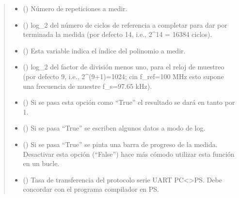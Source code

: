 \documentclass[letterpaper,10pt,english]{sphinxmanual}
\begin{document}
\begin{fulllineitems}
\begin{fulllineitems}
\begin{quote}
\begin{description}
\begin{itemize}
\item {} 
\sphinxAtStartPar
{} () \textendash{} Número de repeticiones a medir.

\item {} 
\sphinxAtStartPar
{} () \textendash{} log\_2 del número de ciclos de referencia a completar para dar por terminada la medida (por defecto 14, i.e., 2\textasciicircum{}14 = 16384 ciclos).

\item {} 
\sphinxAtStartPar
{} () \textendash{} Esta variable indica el índice del polinomio a medir.

\item {} 
\sphinxAtStartPar
{} () \textendash{} log\_2 del factor de división menos uno, para el reloj de muestreo (por defecto 9, i.e., 2\textasciicircum{}(9+1)=1024; cin f\_ref=100 MHz esto supone una frecuencia de muestre f\_s=97.65 kHz).

\item {} 
\sphinxAtStartPar
{} () \textendash{} Si se pasa esta opción como “True” el resultado se dará en tanto por 1.

\item {} 
\sphinxAtStartPar
{} () \textendash{} Si se pasa “True” se escriben algunos datos a modo de log.

\item {} 
\sphinxAtStartPar
{} () \textendash{} Si se pasa “True” se pinta una barra de progreso de la medida. Desactivar esta opción (“False”) hace más cómodo utilizar esta función en un bucle.

\item {} 
\sphinxAtStartPar
{} () \textendash{} Tasa de transferencia del protocolo serie UART PC\textless{}\textendash{}\textgreater{}PS. Debe concordar con el programa compilador en PS.


\end{itemize}
\end{description}
\end{quote}
\end{fulllineitems}
\end{fulllineitems}
\end{document}
